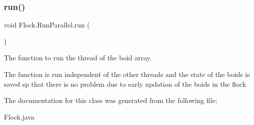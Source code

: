 \subsubsection{\texorpdfstring{run()}{run()}}
{\footnotesize\ttfamily void Flock.\+Run\+Parallel.\+run (\begin{DoxyParamCaption}{ }\end{DoxyParamCaption})\hspace{0.3cm}{\ttfamily [inline]}}



The function to run the thread of the boid array. 

The function is run independent of the other threads and the state of the boids is saved sp that there is no problem due to early updation of the boids in the flock 

The documentation for this class was generated from the following file\+:\begin{DoxyCompactItemize}
\item 
Flock.\+java\end{DoxyCompactItemize}
